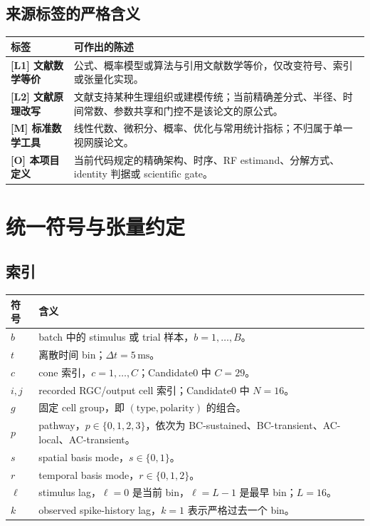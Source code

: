 \documentclass[UTF8,12pt,a4paper]{ctexart}
\numberwithin{equation}{section}
\newcommand{\LitDirect}{\textcolor{caveatred}{\textbf{[L1] 文献数学等价}}}
\newcommand{\LitAdapted}{\textcolor{adaptedgold}{\textbf{[L2] 文献原理改写}}}
\newcommand{\StandardMath}{\textcolor{standardgray}{\textbf{[M] 标准数学工具}}}
\newcommand{\OurOriginal}{\textcolor{projectgreen}{\textbf{[O] 本项目定义}}}
\begin{document}
\subsection{来源标签的严格含义}

\begin{longtable}{>{\raggedright\arraybackslash}p{}>{\raggedright\arraybackslash}p{}}
\toprule
标签 & 可作出的陈述 \\
\midrule
\LitDirect & 公式、概率模型或算法与引用文献数学等价，仅改变符号、索引或张量化实现。\\
\LitAdapted & 文献支持某种生理组织或建模传统；当前精确差分式、半径、时间常数、参数共享和门控不是该论文的原公式。\\
\StandardMath & 线性代数、微积分、概率、优化与常用统计指标；不归属于单一视网膜论文。\\
\OurOriginal & 当前代码规定的精确架构、时序、RF estimand、分解方式、identity 判据或 scientific gate。\\
\bottomrule
\end{longtable}

\section{统一符号与张量约定}

\subsection{索引}

\begin{longtable}{>{\centering\arraybackslash}p{}>{\raggedright\arraybackslash}p{}}
\toprule
符号 & 含义 \\
\midrule
$b$ & batch 中的 stimulus 或 trial 样本，$b=1,\ldots,B$。\\
$t$ & 离散时间 bin；$\Delta t=5\,\mathrm{ms}$。\\
$c$ & cone 索引，$c=1,\ldots,C$；Candidate0 中 $C=29$。\\
$i,j$ & recorded RGC/output cell 索引；Candidate0 中 $N=16$。\\
$g$ & 固定 cell group，即 $(\text{type},\text{polarity})$ 的组合。\\
$p$ & pathway，$p\in\{0,1,2,3\}$，依次为 BC-sustained、BC-transient、AC-local、AC-transient。\\
$s$ & spatial basis mode，$s\in\{0,1\}$。\\
$r$ & temporal basis mode，$r\in\{0,1,2\}$。\\
$\ell$ & stimulus lag，$\ell=0$ 是当前 bin，$\ell=L-1$ 是最早 bin；$L=16$。\\
$k$ & observed spike-history lag，$k=1$ 表示严格过去一个 bin。\\
\bottomrule
\end{longtable}
\end{document}
